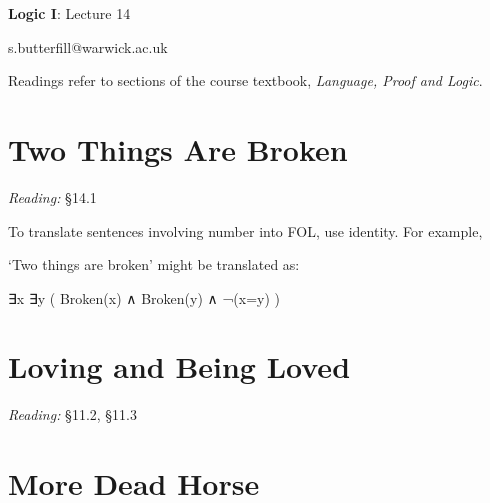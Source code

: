 \documentclass[12pt]{extarticle}
\date{}
\makeatletter
\def \ititle {Origins of Mind}
\def \isubtitle {Lecture 08}
\def \iemail{s.butterfill@warwick.ac.uk}
\makeatother
\begin{document}

\begin{multicols*}{3}

\setlength\footnotesep{1em}








\def \ititle {Logic I}
 
\def \isubtitle {Lecture 14}
 
\begin{center}
 
{\Large
 
\textbf{\ititle}: \isubtitle
 
}
 
 
 
\iemail %
 
\end{center}
 
Readings refer to sections of the course textbook, \emph{Language, Proof and Logic}.
 
 
 
\section{Two Things Are Broken}
 
\emph{Reading:} §14.1
 
To translate sentences involving number into FOL, use identity. For example,
 
`Two things are broken' might be translated as:
 
∃x ∃y ( Broken(x) ∧ Broken(y) ∧ ¬(x=y) )
 
 
 
\section{Loving and Being Loved}
 
\emph{Reading:} §11.2, §11.3
 
 
 
\section{More Dead Horse}
 

\end{multicols*}
\end{document}
